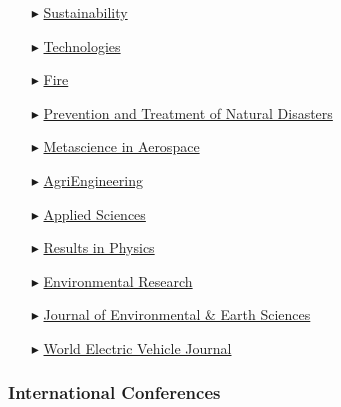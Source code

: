 \begin{itemize}
    \item[$\blacktriangleright$] \href{https://www.mdpi.com/journal/sustainability/}{Sustainability}

    \item[$\blacktriangleright$] \href{https://www.mdpi.com/journal/technologies/}{Technologies}

    \item[$\blacktriangleright$] \href{https://www.mdpi.com/journal/fire/}{Fire}

    \item[$\blacktriangleright$] \href{https://ojs.ukscip.com/index.php/ptnd/}{Prevention and Treatment of Natural Disasters}

    \item[$\blacktriangleright$] \href{https://www.aimspress.com/journal/mina/}{Metascience in Aerospace}

    \item[$\blacktriangleright$] \href{https://www.mdpi.com/journal/agriengineering/}{AgriEngineering}

    \item[$\blacktriangleright$] \href{https://www.mdpi.com/journal/applsci/}{Applied Sciences}

    \item[$\blacktriangleright$] \href{https://www.sciencedirect.com/journal/results-in-physics/}{Results in Physics}

    \item[$\blacktriangleright$] \href{https://www.sciencedirect.com/journal/environmental-research/ }{Environmental Research}
    
    \item[$\blacktriangleright$] \href{https://journals.bilpubgroup.com/index.php/jees/}{Journal of Environmental \& Earth Sciences}

    \item[$\blacktriangleright$] \href{https://www.mdpi.com/journal/wevj/}{World Electric Vehicle Journal}
    
\end{itemize}

\separator
\subsubsection{International Conferences}

